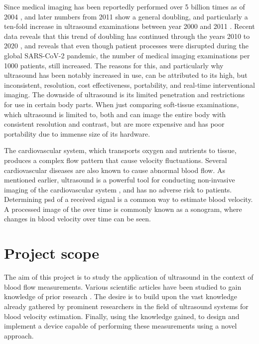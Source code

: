 Since medical imaging has been reportedly performed over 5 billion times as of 2004 \cite{Picano2004}, and later numbers from 2011 show a general doubling, and particularly a ten-fold increase in ultrasound examinations between year 2000 and 2011 \cite{Szabo_UltrasoundBook_2}. Recent data reveals that this trend of doubling has continued through the years 2010 to 2020 \cite{Winder2021}, and reveals that even though patient processes were disrupted during the global SARS-CoV-2 pandemic, the number of medical imaging examinations per 1000 patients, still increased. The reasons for this, and particularly why ultrasound has been notably increased in use, can be attributed to its high, but inconsistent, resolution, cost effectiveness, portability, and real-time interventional imaging. The downside of ultrasound is its limited penetration and restrictions for use in certain body parts. When just comparing soft-tissue examinations, which ultrasound is limited to, both  and  can image the entire body with consistent resolution and contrast, but are more expensive and has poor portability due to immense size of its hardware. 

The cardiovascular system, which transports oxygen and nutrients to tissue, produces a complex flow pattern that cause velocity fluctuations. Several cardiovascular diseases are also known to cause abnormal blood flow. As mentioned earlier, ultrasound is a powerful tool for conducting non-invasive imaging of the cardiovascular system \cite{JensenUltrasoundBook,Hansen_thesis}, and has no adverse risk to patients. Determining \gls{psd} of a received signal is a common way to estimate blood velocity. A processed image of the  over time is commonly known as a sonogram, where changes in blood velocity over time can be seen. 

\section{Project scope}
The aim of this project is to study the application of ultrasound in the context of blood flow measurements. Various scientific articles have been studied to gain knowledge of prior research \cite{Jensen_Analysis_PW_1996,Jansson_Estimation_Perfusion,Huang_Smartphone_2012,JanaSmartphone2020,DingPMUTs,Ding_PW_Pmut}. The desire is to build upon the vast knowledge already gathered by prominent researchers in the field of ultrasound systems for blood velocity estimation. Finally, using the knowledge gained, to design and implement a device capable of performing these measurements using a novel approach.


